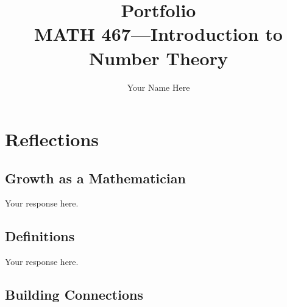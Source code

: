 \documentclass[12pt]{amsart}
\begin{document}
 
\title{Portfolio\\MATH 467---Introduction to Number Theory}
\author{Your Name Here}
\maketitle

\section{Reflections}

\subsection{Growth as a Mathematician}


Your response here.

\subsection{Definitions}


Your response here.

\subsection{Building Connections}

\end{document}
